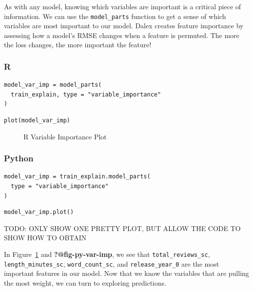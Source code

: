 \documentclass[
  letterpaper,
]{krantz}
\begin{document}
As with any model, knowing which variables are important is a critical
piece of information. We can use the \texttt{model\_parts} function to
get a sense of which variables are most important to our model. Dalex
creates feature importance by assessing how a model's RMSE changes when
a feature is permuted. The more the loss changes, the more important the
feature!

\subsubsection{R}

\begin{verbatim}
model_var_imp = model_parts(
  train_explain, type = "variable_importance"
)
\end{verbatim}

\begin{verbatim}
plot(model_var_imp)
\end{verbatim}

\begin{figure}[H]


\caption{\label{fig-r-var-imp}R Variable Importance Plot}

\end{figure}%

\subsubsection{Python}

\begin{verbatim}
model_var_imp = train_explain.model_parts(
  type = "variable_importance"
)
\end{verbatim}

\begin{verbatim}
model_var_imp.plot()
\end{verbatim}

TODO: ONLY SHOW ONE PRETTY PLOT, BUT ALLOW THE CODE TO SHOW HOW TO
OBTAIN

In Figure~\ref{fig-r-var-imp} and \textbf{?@fig-py-var-imp}, we see that
\texttt{total\_reviews\_sc}, \texttt{length\_minutes\_sc},
\texttt{word\_count\_sc}, and \texttt{release\_year\_0} are the most
important features in our model. Now that we know the variables that are
pulling the most weight, we can turn to exploring predictions.
\end{document}
